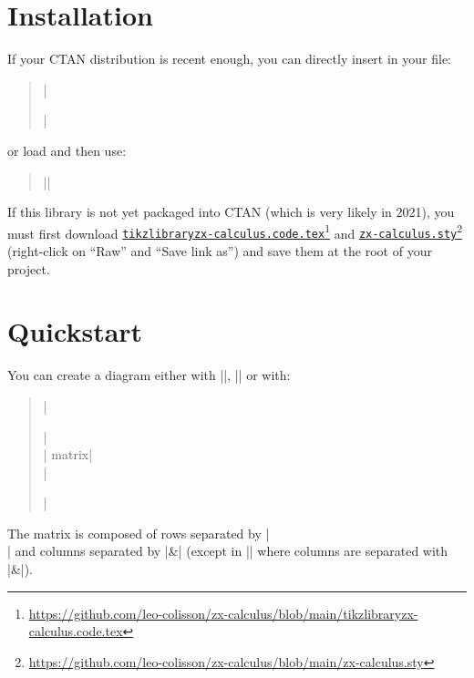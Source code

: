\documentclass[a4paper,doc2]{ltxdoc} %
\newcommand{\mylink}[2]{\href{#1}{#2}\footnote{\url{#1}}}
\begin{document}
\section{Installation}

If your CTAN distribution is recent enough, you can directly insert in your file:
\begin{verse}
  |\usepackage{zx-calculus}|%
\end{verse}
or load \tikzname{} and then use:
\begin{verse}%
   |\usetikzlibrary{zx-calculus}|%
\end{verse}
If this library is not yet packaged into CTAN (which is very likely in 2021), you must first download \mylink{https://github.com/leo-colisson/zx-calculus/blob/main/tikzlibraryzx-calculus.code.tex}{\texttt{tikzlibraryzx-calculus.code.tex}} and \mylink{https://github.com/leo-colisson/zx-calculus/blob/main/zx-calculus.sty}{\texttt{zx-calculus.sty}} (right-click on ``Raw'' and ``Save link as'') and save them at the root of your project.

\section{Quickstart}

You can create a diagram either with ||, || or with:
\begin{verse}
  |\begin{ZX}[options]|\\
    |  matrix|\\
  |\end{ZX}|
\end{verse}
The matrix is composed of rows separated by |\\| and columns separated by |&| (except in |\zxAmp| where columns are separated with |\&|).

\end{document}
